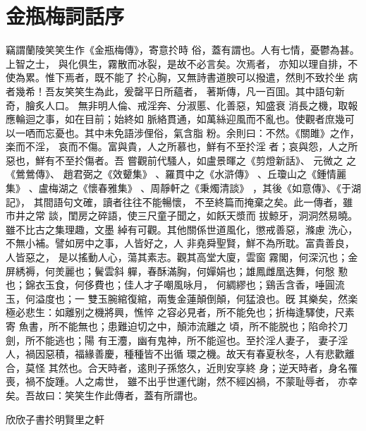 %

\chapter*{金瓶梅詞話序}

\begin{showcontents}{}


竊謂蘭陵笑笑生作《金瓶梅傳》，寄意扵時
俗，蓋有謂也。人有七情，憂鬱為甚。上智之士，
與化俱生，霧散而冰裂，是故不必言矣。次焉者，
亦知以理自排，不使為累。惟下焉者，既不能了
扵心胸，又無詩書道腴可以撥遣，然則不致扵坐
病者幾希！吾友笑笑生為此，爰罄平日所蘊者，
著斯傳，凡一百囬。其中語句新奇，膾炙人口。
無非明人倫、戒淫奔、分淑慝、化善惡，知盛衰
消長之機，取報應輪迴之事，如在目前；始終如
脈絡貫通，如萬絲迎風而不亂也。使觀者庶幾可
以一哂而忘憂也。其中未免語涉俚俗，氣含脂
粉。余則曰：不然。《關雎》之作，楽而不淫，
哀而不傷。富與貴，人之所慕也，鮮有不至扵淫
者；哀與怨，人之所惡也，鮮有不至扵傷者。吾
嘗觀前代騷人，如盧景暉之《剪燈新話》、
元微之
之《鶯鶯傳》、
趙君弼之《效顰集》
、羅貫中之《水滸傳》
、丘瓊山之《鍾情麗集》
、盧梅湖之《懷春雅集》
、周靜軒之《秉燭清談》
，其後《如意傳》、《于湖記》，
其間語句文確，讀者往往不能暢懷，
不至終篇而掩棄之矣。此一傳者，雖市井之常
談，閨房之碎語，使三尺童子聞之，如飫天漿而
拔鯨牙，洞洞然易曉。雖不比古之集理趣，文墨
綽有可觀。其他關係世道風化，懲戒善惡，滌慮
洗心，不無小補。譬如房中之事，人皆好之，人
非堯舜聖賢，鮮不為所耽。富貴善良，人皆惡之，
是以搖動人心，蕩其素志。觀其高堂大廈，雲窗
霧閣，何深沉也；金屏綉褥，何羙麗也；鬢雲斜
軃，春酥滿胸，何嬋娟也；雄鳳雌凰迭舞，何慇
懃也；錦衣玉食，何侈費也；佳人才子嘲風咏月，
何綢繆也；鷄舌含香，唾圓流玉，何溢度也；一
雙玉腕綰復綰，兩隻金蓮顛倒顛，何猛浪也。旣
其樂矣，然楽極必悲生：如離别之機將興，憔悴
之容必見者，所不能免也；折梅逢驛使，尺素寄
魚書，所不能無也；患難迫切之中，顛沛流離之
頃，所不能脱也；陷命扵刀劍，所不能逃也；陽
有王灋，幽有鬼神，所不能逭也。至扵淫人妻子，
妻子淫人，禍因惡積，福緣善慶，種種皆不出循
環之機。故天有春夏秋冬，人有悲歡離合，莫怪
其然也。合天時者，逺則子孫悠久，近則安享終
身；逆天時者，身名罹喪，禍不旋踵。人之䖏世，
雖不出乎世運代謝，然不經凶禍，不蒙耻辱者，
亦幸矣。吾故曰：笑笑生作此傳者，蓋有所謂也。

{\bigskip\mbox{}\fzqiti\large\hfill 欣欣子書扵明賢里之軒 \quad }







\end{showcontents}
